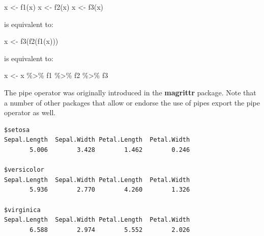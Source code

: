 \documentclass[
]{book}
\newenvironment{Shaded}{\begin{snugshade}}{\end{snugshade}}
\newcommand{\ControlFlowTok}[1]{\textcolor[rgb]{0.13,0.29,0.53}{\textbf{#1}}}
\newcommand{\DecValTok}[1]{\textcolor[rgb]{0.00,0.00,0.81}{#1}}
\newcommand{\FunctionTok}[1]{\textcolor[rgb]{0.00,0.00,0.00}{#1}}
\newcommand{\NormalTok}[1]{#1}
\newcommand{\OtherTok}[1]{\textcolor[rgb]{0.56,0.35,0.01}{#1}}
\newcommand{\SpecialCharTok}[1]{\textcolor[rgb]{0.00,0.00,0.00}{#1}}
\begin{document}
\begin{Shaded}
\begin{Highlighting}[]
\NormalTok{x }\OtherTok{\textless{}{-}} \FunctionTok{f1}\NormalTok{(x)}
\NormalTok{x }\OtherTok{\textless{}{-}} \FunctionTok{f2}\NormalTok{(x)}
\NormalTok{x }\OtherTok{\textless{}{-}} \FunctionTok{f3}\NormalTok{(x)}
\end{Highlighting}
\end{Shaded}

is equivalent to:

\begin{Shaded}
\begin{Highlighting}[]
\NormalTok{x }\OtherTok{\textless{}{-}} \FunctionTok{f3}\NormalTok{(}\FunctionTok{f2}\NormalTok{(}\FunctionTok{f1}\NormalTok{(x)))}
\end{Highlighting}
\end{Shaded}

is equivalent to:

\begin{Shaded}
\begin{Highlighting}[]
\NormalTok{x }\OtherTok{\textless{}{-}}\NormalTok{ x }\SpecialCharTok{\%\textgreater{}\%}\NormalTok{ f1 }\SpecialCharTok{\%\textgreater{}\%}\NormalTok{ f2 }\SpecialCharTok{\%\textgreater{}\%}\NormalTok{ f3}
\end{Highlighting}
\end{Shaded}

The pipe operator was originally introduced in the \textbf{magrittr} package. Note that a number of other packages that allow or endorse the use of pipes export the pipe operator as well.

\begin{Shaded}
\end{Shaded}

\begin{verbatim}
$setosa
Sepal.Length  Sepal.Width Petal.Length  Petal.Width 
       5.006        3.428        1.462        0.246 

$versicolor
Sepal.Length  Sepal.Width Petal.Length  Petal.Width 
       5.936        2.770        4.260        1.326 

$virginica
Sepal.Length  Sepal.Width Petal.Length  Petal.Width 
       6.588        2.974        5.552        2.026 
\end{verbatim}
\end{document}
